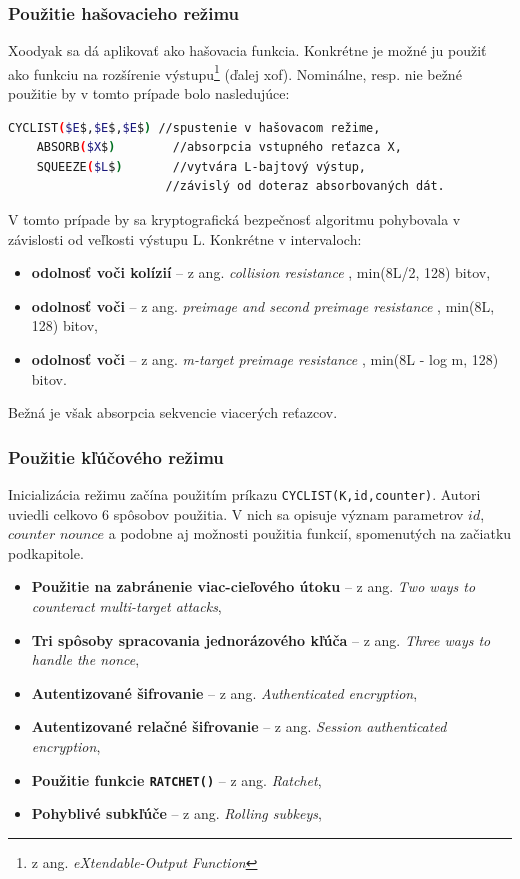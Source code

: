 \subsubsection{Použitie hašovacieho režimu}
Xoodyak sa dá aplikovať ako hašovacia funkcia. Konkrétne je možné ju použiť ako funkciu na rozšírenie výstupu\footnote{z ang. \textit{eXtendable-Output Function}} (ďalej \acrshort{xof}). Nominálne, resp. nie bežné použitie by v tomto prípade bolo nasledujúce: 
\begin{lstlisting}[language=bash,mathescape=true]
	CYCLIST($E$,$E$,$E$) //spustenie v hašovacom režime,
 	ABSORB($X$)        //absorpcia vstupného reťazca X,
 	SQUEEZE($L$)       //vytvára L-bajtový výstup, 
	     	          //závislý od doteraz absorbovaných dát.
\end{lstlisting}
V tomto prípade by sa kryptografická bezpečnosť algoritmu pohybovala v závislosti od veľkosti výstupu L. Konkrétne v intervaloch:
\begin{itemize}
	\item{\textbf{odolnosť voči kolízií}} -- z ang. \textit{collision resistance} \cite{cr}, min(8L/2, 128) bitov,
	\item{\textbf{odolnosť voči }} -- z ang. \textit{preimage and second preimage resistance} \cite{pa}, min(8L, 128) bitov,
	\item{\textbf{odolnosť voči}} -- z ang. \textit{m-target preimage resistance} \cite{pa}, min(8L - log m, 128) bitov.
\end{itemize}
Bežná je však absorpcia sekvencie viacerých reťazcov.

\subsubsection{Použitie kľúčového režimu}
Inicializácia režimu začína použitím príkazu \lstinline|CYCLIST(K,id,counter)|. Autori uviedli celkovo 6 spôsobov použitia. V nich sa opisuje význam parametrov $id$, $counter$ $nounce$ a podobne aj možnosti použitia funkcií, spomenutých na začiatku podkapitole.
\begin{itemize}
	\item{\textbf{Použitie na zabránenie viac-cieľového útoku}} -- z ang. \textit{Two ways to counteract multi-target attacks},
	\item{\textbf{Tri spôsoby spracovania jednorázového kľúča}} -- z ang. \textit{Three ways to handle the nonce},
	\item{\textbf{Autentizované šifrovanie}} -- z ang. \textit{Authenticated encryption},
	\item{\textbf{Autentizované relačné šifrovanie}} -- z ang. \textit{Session authenticated encryption},
	\item{\textbf{Použitie funkcie \lstinline|RATCHET()|}} -- z ang. \textit{Ratchet},
	\item{\textbf{Pohyblivé subkľúče}} -- z ang. \textit{Rolling subkeys},
\end{itemize}

